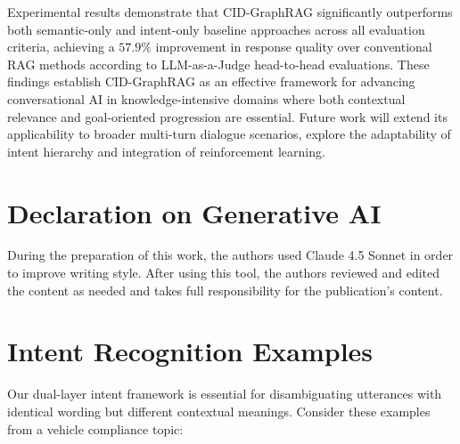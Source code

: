 \documentclass[
]{style/ceurart}
\begin{document}
Experimental results demonstrate that CID-GraphRAG significantly outperforms both semantic-only and intent-only baseline approaches across all evaluation criteria, achieving a $57.9\%$ improvement in response quality over conventional RAG methods according to LLM-as-a-Judge head-to-head evaluations. These findings establish CID-GraphRAG as an effective framework for advancing conversational AI in knowledge-intensive domains where both contextual relevance and goal-oriented progression are essential. Future work will extend its applicability to broader multi-turn dialogue scenarios, explore the adaptability of intent hierarchy and integration of reinforcement learning.


\newpage


\section*{Declaration on Generative AI}
During the preparation of this work, the authors used Claude 4.5 Sonnet in order to improve writing style. After using this tool, the authors reviewed and edited the content as needed and takes full responsibility for the publication's content.

\newpage
\appendix
\section{Intent Recognition Examples}
\label{app:intent_recognition}
Our dual-layer intent framework is essential for disambiguating utterances with identical wording but different contextual meanings. Consider these examples from a vehicle compliance topic:
\end{document}
